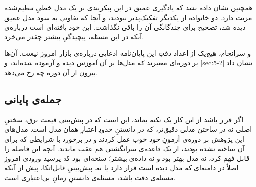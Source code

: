 همچنین نشان داده نشد که یادگیری عمیق در این پیکربندی بر یک مدل خطیِ تنظیم‌شده
مزیت دارد. دو خانواده از یکدیگر تفکیک‌پذیر نبودند، و آنجا که تفاوتی به سود مدل
عمیق دیده شد، تصحیح برای چندگانگی آن را باقی نگذاشت. این خود یافته‌ای است
درباره‌ی آنکه در این مسئله، پیچیدگیِ بیشتر چقدر می‌خرد.

و سرانجام، هیچ‌یک از اعداد دقتِ این پایان‌نامه ادعایی درباره‌ی بازار امروز
نیست. آن‌ها بر دوره‌ای معتبرند که مدل‌ها بر آن آموزش دیده و آزموده شده‌اند، و
\cref{sec:5-2} نشان داد بیرون از آن دوره چه رخ می‌دهد.

\enlargethispage{2\baselineskip}

\subsection*{جمله‌ی پایانی}

{
اگر قرار باشد از این کار یک نکته بماند، این است که در پیش‌بینی قیمت برق،
سختیِ اصلی نه در ساختن مدلی دقیق‌تر، که در دانستنِ حدودِ اعتبارِ همان مدل است.
مدل‌های این پژوهش بر دوره‌ی آزمونِ خود خوب عمل کردند و در برخورد با شرایطی که
برای آن ساخته نشده بودند، از یک قاعده‌ی سرانگشتی هم عقب ماندند. آنچه این فاصله
را قابل فهم کرد، نه مدل بهتر بود و نه داده‌ی بیشتر؛ سنجه‌ای بود که پرسید ورودی
امروز اصلاً در دامنه‌ای که مدل دیده است قرار دارد یا نه. پیش‌بینیِ قابل‌اتکا،
پیش از آنکه مسئله‌ی دقت باشد، مسئله‌ی دانستنِ زمانِ بی‌اعتباری است.\par}
